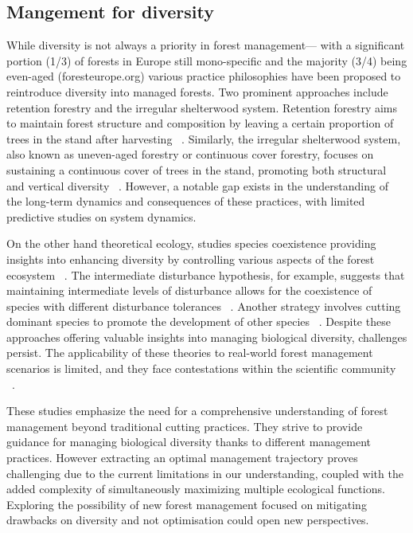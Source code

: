 \documentclass{article}
\begin{document}
\subsection{Mangement for diversity}

While diversity is not always a priority in forest management— with a significant portion (1/3) of forests in Europe still mono-specific and the majority (3/4) being even-aged (foresteurope.org) various practice philosophies have been proposed to reintroduce diversity into managed forests. Two prominent approaches include retention forestry and the irregular shelterwood system.
Retention forestry aims to maintain forest structure and composition by leaving a certain proportion of trees in the stand after harvesting ~\autocite{gustafssonRetentionForestryMaintain2012,rosenvaldWhatWhenWhere2008}. Similarly, the irregular shelterwood system, also known as uneven-aged forestry or continuous cover forestry, focuses on sustaining a continuous cover of trees in the stand, promoting both structural and vertical diversity ~\autocite{sinhaOptimalManagementNaturally2017,schallImpactEvenagedUnevenaged2018,nylandEvenUnevenagedChallenges2003,noletComparingEffectsEven2018,dudumanForestManagementPlanning2011}. However, a notable gap exists in the understanding of the long-term dynamics and consequences of these practices, with limited predictive studies on system dynamics.

On the other hand theoretical ecology, studies species coexistence providing insights into enhancing diversity by controlling various aspects of the forest ecosystem ~\autocite{wilsonTwelveTheoriesCoexistence2011}. The intermediate disturbance hypothesis, for example, suggests that maintaining intermediate levels of disturbance allows for the coexistence of species with different disturbance tolerances ~\autocite{connellDiversityTropicalRain1978,sheilDefiningDefendingConnell2013}. Another strategy involves cutting dominant species to promote the development of other species ~\autocite{pichancourtGrowingBiodiverseCarbonrich2014}.
Despite these approaches offering valuable insights into managing biological diversity, challenges persist. The applicability of these theories to real-world forest management scenarios is limited, and they face contestations within the scientific community ~\autocite{mackeyReexaminationExpectedEffects2000,foxIntermediateDisturbanceHypothesis2013}.

These studies emphasize the need for a comprehensive understanding of forest management beyond traditional cutting practices. They strive to provide guidance for managing biological diversity thanks to different management practices. However extracting an optimal management trajectory proves challenging due to the current limitations in our understanding, coupled with the added complexity of simultaneously maximizing multiple ecological functions. Exploring the possibility of new forest management focused on mitigating drawbacks on diversity and not optimisation could open new perspectives.\\
\end{document}
